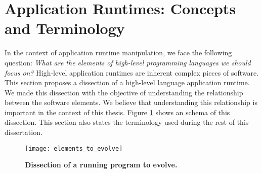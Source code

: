 


\section{Application Runtimes: Concepts and Terminology}

In the context of application runtime manipulation, we face the following question: \emph{What are the elements of high-level programming languages we should focus on?} High-level application runtimes are inherent complex pieces of software. 
This section proposes a dissection of a high-level language application runtime. We made this dissection with the objective of understanding the relationship between the software elements. We believe that understanding this relationship is important in the context of this thesis. Figure \ref{fig:whatToEvolve} shows an schema of this dissection. This section also states the terminology used during the rest of this dissertation.

\begin{figure}[!ht]
\begin{center}
\texttt{[image: elements\_to\_evolve]}
\caption{\textbf{Dissection of a running program to evolve.}\label{fig:whatToEvolve} }
\end{center}
\end{figure}

